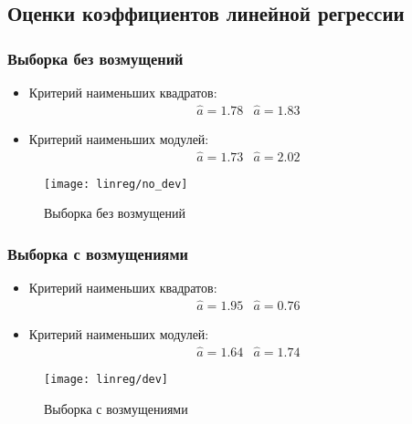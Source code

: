 \subsection{Оценки коэффициентов линейной регрессии}

\subsubsection{Выборка без возмущений}
\begin{itemize}
	\item Критерий наименьших квадратов:
	$$
	\begin{matrix}
		\hat{a}=1.78 & \hat{a}=1.83
	\end{matrix}
	$$
	
	\item Критерий наименьших модулей:
	$$
	\begin{matrix}
	\hat{a}=1.73 & \hat{a}=2.02
	\end{matrix}
	$$
\end{itemize}

\begin{figure}[H]
	\texttt{[image: linreg/no\_dev]}
	\caption{Выборка без возмущений}
\end{figure}

\subsubsection{Выборка с возмущениями}
\begin{itemize}
	\item Критерий наименьших квадратов:
	$$
	\begin{matrix}
	\hat{a}=1.95 & \hat{a}=0.76
	\end{matrix}
	$$
	
	\item Критерий наименьших модулей:
	$$
	\begin{matrix}
	\hat{a}=1.64 & \hat{a}=1.74
	\end{matrix}
	$$
\end{itemize}

\begin{figure}[H]
	\texttt{[image: linreg/dev]}
	\caption{Выборка с возмущениями}
\end{figure}
